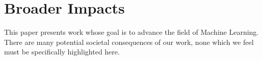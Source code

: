 \section*{Broader Impacts} This paper presents work whose goal is to advance the field of Machine Learning. There are many potential societal consequences of our work, none which we feel must be specifically highlighted here.

	\balance

